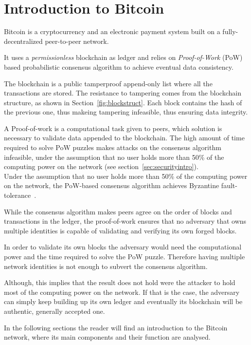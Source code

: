 \chapter{Introduction to Bitcoin}
\label{sec:introbtc}

Bitcoin is a cryptocurrency and an electronic payment system built on a fully-decentralized peer-to-peer network.

It uses a \textit{permissionless} blockchain as ledger and relies on \emph{Proof-of-Work} (PoW) based probabilistic consensus algorithm to achieve eventual data consistency.

The blockchain is a public tamperproof append-only list where all the transactions are stored. The resistance to tampering comes from the blockchain structure, as shown in Section~\ref{fig:blockstruct}. Each block contains the hash of the previous one, thus makeing tampering infeasible, thus ensuring data integrity.

A Proof-of-work is a computational task given to peers, which solution is necessary to validate data appended to the blockchain. The high amount of time required to solve PoW puzzles makes attacks on the consensus algorithm infeasible, under the assumption that no user holds more than 50\% of the computing power on the network (see section~\ref{sec:securityintro}).\\

Under the assumption that no user holds more than 50\% of the computing power on the network, the PoW-based consensus algorithm achieves Byzantine fault-tolerance~\cite{nakamoto}.

While the consensus algorithm makes peers agree on the order of blocks and transactions in the ledger, the proof-of-work ensures that no adversary that owns multiple identities is capable of validating and verifying its own forged blocks.

In order to validate its own blocks the adversary would need the computational power and the time required to solve the PoW puzzle. Therefore having multiple network identities is not enough to subvert the consensus algorithm. 

Although, this implies that the result does not hold were the attacker to hold most of the computing power on the network. If that is the case, the adversary can simply keep building up its own ledger and eventually its blockchain will be authentic, generally accepted one.

In the following sections the reader will find an introduction to the Bitcoin network, where its main components and their function are analysed.


